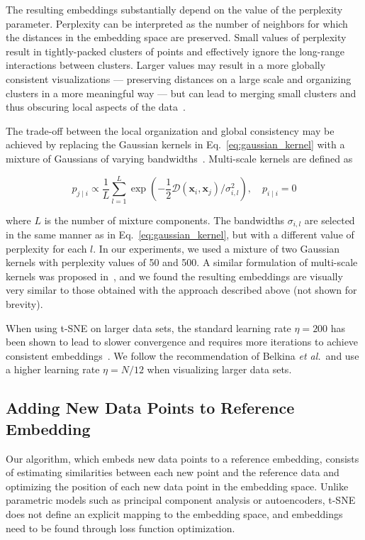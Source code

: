 \documentclass[runningheads]{llncs}
\newcommand{\etal}{\textit{et al.}}
\begin{document}
The resulting embeddings substantially depend on the value of the perplexity
parameter. Perplexity can be interpreted as the number of neighbors for which
the distances in the embedding space are preserved. Small values of perplexity
result in tightly-packed clusters of points and effectively ignore the
long-range interactions between clusters. Larger values may result in a more
globally consistent visualizations --- preserving distances on a large scale
and organizing clusters in a more meaningful way --- but can lead to merging
small clusters and thus obscuring local aspects of the
data~\cite{Kobak2019}.

The trade-off between the local organization and global consistency may be
achieved by replacing the Gaussian kernels in Eq.~\ref{eq:gaussian_kernel} with
a mixture of Gaussians of varying bandwidths~\cite{Lee2015}.
Multi-scale kernels are defined as

\begin{equation}
p_{j \mid i} \propto \frac{1}{L} \sum_{l=1}^{L} \exp \left ( - \frac{1}{2} \mathcal{D}(\mathbf{x}_i, \mathbf{x}_j ) / \sigma_{i,l}^2 \right ), \quad p_{i \mid i} = 0
\label{eq:multiscale}
\end{equation}

\noindent where $L$ is the number of mixture components. The bandwidths
$\sigma_{i,l}$ are selected in the same manner as in
Eq.~\ref{eq:gaussian_kernel}, but with a different value of perplexity for each
$l$. In our experiments, we used a mixture of two Gaussian kernels with
perplexity values of 50 and 500. A similar formulation of
multi-scale kernels was proposed in~\cite{Kobak2019}, and we found the
resulting embeddings are visually very similar to those obtained with the
approach described above (not shown for brevity).

When using t-SNE on larger data sets, the standard learning rate $\eta = 200$
has been shown to lead to slower convergence and requires more iterations to
achieve consistent embeddings~\cite{Belkina2019}. We follow the
recommendation of Belkina \etal ~and use a higher learning rate $\eta = N / 12$
when visualizing larger data sets.


\subsection{Adding New Data Points to Reference Embedding\label{sec:transfer}}

Our algorithm, which embeds new data points to a reference embedding, consists
of estimating similarities between each new point and the reference data and
optimizing the position of each new data point in the embedding space. Unlike
parametric models such as principal component analysis or autoencoders, t-SNE
does not define an explicit mapping to the embedding space, and embeddings need
to be found through loss function optimization.
\end{document}
